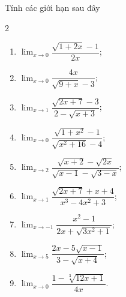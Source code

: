 \begin{ex}%
	 Tính các giới hạn sau đây
	\begin{multicols}{2}
		\begin{enumerate}
			\item $\displaystyle\lim_{x\to 0} \dfrac{\sqrt{1+2x}-1}{2x}$; 
			\item $\displaystyle\lim_{x\to 0} \dfrac{4x}{\sqrt{9+x}-3}$; 
			\item $\displaystyle\lim_{x\to 1}  \dfrac{\sqrt{2x+7}-3}{2-\sqrt{x+3}}$;
			\item $\displaystyle\lim_{x\to 0} \dfrac{\sqrt{1+x^2}-1}{\sqrt{x^2+16}-4}$; 
			\item  $\displaystyle\lim_{x\to 2} \dfrac{\sqrt{x+2}-\sqrt{2x}}{\sqrt{x-1}-\sqrt{3-x}}$;
			\item  $\displaystyle\lim_{x\to 1} \dfrac{\sqrt{2x+7}+x+4}{x^3-4x^2+3}$;
			\item $\displaystyle\lim_{x\to -1} \dfrac{x^2-1}{2x+\sqrt{3x^2+1}}$; 
			\item $\displaystyle\lim_{x\to 5}  \dfrac{2x-5\sqrt{x-1}}{3-\sqrt{x+4}}$;
			 \item $\displaystyle\lim_{x\to 0} \dfrac{1-\sqrt[3]{12x+1}}{4x}$.
		\end{enumerate}
	\end{multicols}
\end{ex}
